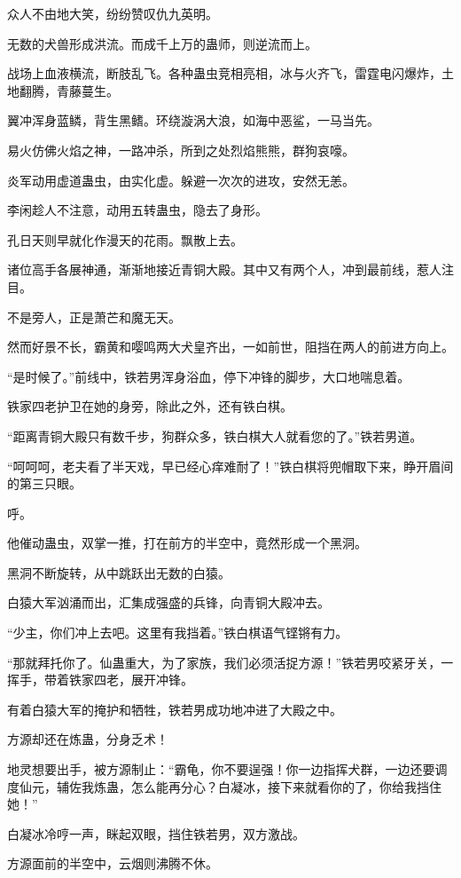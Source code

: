 \begin{this_body}
众人不由地大笑，纷纷赞叹仇九英明。

无数的犬兽形成洪流。而成千上万的蛊师，则逆流而上。

战场上血液横流，断肢乱飞。各种蛊虫竞相亮相，冰与火齐飞，雷霆电闪爆炸，土地翻腾，青藤蔓生。

翼冲浑身蓝鳞，背生黑鳍。环绕漩涡大浪，如海中恶鲨，一马当先。

易火仿佛火焰之神，一路冲杀，所到之处烈焰熊熊，群狗哀嚎。

炎军动用虚道蛊虫，由实化虚。躲避一次次的进攻，安然无恙。

李闲趁人不注意，动用五转蛊虫，隐去了身形。

孔日天则早就化作漫天的花雨。飘散上去。

诸位高手各展神通，渐渐地接近青铜大殿。其中又有两个人，冲到最前线，惹人注目。

不是旁人，正是萧芒和魔无天。

然而好景不长，霸黄和嘤鸣两大犬皇齐出，一如前世，阻挡在两人的前进方向上。

“是时候了。”前线中，铁若男浑身浴血，停下冲锋的脚步，大口地喘息着。

铁家四老护卫在她的身旁，除此之外，还有铁白棋。

“距离青铜大殿只有数千步，狗群众多，铁白棋大人就看您的了。”铁若男道。

“呵呵呵，老夫看了半天戏，早已经心痒难耐了！”铁白棋将兜帽取下来，睁开眉间的第三只眼。

呼。

他催动蛊虫，双掌一推，打在前方的半空中，竟然形成一个黑洞。

黑洞不断旋转，从中跳跃出无数的白猿。

白猿大军汹涌而出，汇集成强盛的兵锋，向青铜大殿冲去。

“少主，你们冲上去吧。这里有我挡着。”铁白棋语气铿锵有力。

“那就拜托你了。仙蛊重大，为了家族，我们必须活捉方源！”铁若男咬紧牙关，一挥手，带着铁家四老，展开冲锋。

有着白猿大军的掩护和牺牲，铁若男成功地冲进了大殿之中。

方源却还在炼蛊，分身乏术！

地灵想要出手，被方源制止：“霸龟，你不要逞强！你一边指挥犬群，一边还要调度仙元，辅佐我炼蛊，怎么能再分心？白凝冰，接下来就看你的了，你给我挡住她！”

白凝冰冷哼一声，眯起双眼，挡住铁若男，双方激战。

方源面前的半空中，云烟则沸腾不休。


\end{this_body}
